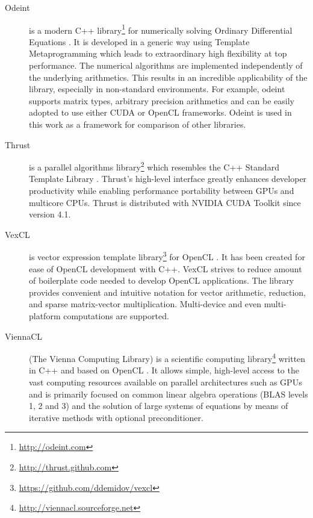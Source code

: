 \documentclass[1p]{elsarticle}
\begin{document}
\begin{description}
    \item[Odeint] is a modern C++
        library\footnote{\href{http://odeint.com}{http://odeint.com}} for
	numerically solving Ordinary Differential Equations \cite{OdeintRef1,
	OdeintRef2}. It is developed in a generic way using Template
	Metaprogramming which leads to extraordinary high flexibility at top
	performance. The numerical algorithms are implemented independently of
	the underlying arithmetics.  This results in an incredible
	applicability of the library, especially in non-standard environments.
	For example, odeint supports matrix types, arbitrary precision
	arithmetics and can be easily adopted to use either CUDA or OpenCL
	frameworks.  Odeint is used in this work as a framework for comparison
	of other libraries.
    \item[Thrust] is a parallel algorithms
        library\footnote{\href{http://thrust.github.com}{http://thrust.github.com}}
	which resembles the C++ Standard Template Library \cite{ThrustRef}.
	Thrust's high-level interface greatly enhances developer productivity
	while enabling performance portability between GPUs and multicore CPUs.
	Thrust is distributed with NVIDIA CUDA Toolkit since version 4.1.
    \item[VexCL] is vector expression template
        library\footnote{\href{https://github.com/ddemidov/vexcl}{https://github.com/ddemidov/vexcl}}
	for OpenCL \cite{VexCLRef}. It has been created for ease of OpenCL
	development with C++.  VexCL strives to reduce amount of boilerplate
	code needed to develop OpenCL applications. The library provides
	convenient and intuitive notation for vector arithmetic, reduction, and
	sparse matrix-vector multiplication.  Multi-device and even
	multi-platform computations are supported. 
    \item[ViennaCL] (The Vienna Computing Library) is a scientific computing
        library\footnote{\href{http://viennacl.sourceforge.net}{http://viennacl.sourceforge.net}}
	written in C++ and based on OpenCL \cite{ViennaCLRef}. It allows
	simple, high-level access to the vast computing resources available on
	parallel architectures such as GPUs and is primarily focused on common
	linear algebra operations (BLAS levels 1, 2 and 3) and the solution of
	large systems of equations by means of iterative methods with optional
	preconditioner.
\end{description}
\end{document}
